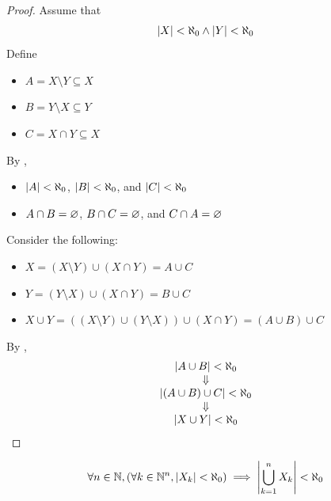 \begin{proof}
    Assume that
    \[
    \abs*{X} < \aleph_{0} \land \abs*{Y} < \aleph_{0}
    \]
    Define
    \begin{itemize}
        \item $A = X \setminus Y \subseteq X$
        \item $B = Y \setminus X \subseteq Y$
        \item $C = X \cap Y \subseteq X$
    \end{itemize}
    By ,
    \begin{itemize}
        \item $\abs*{A} < \aleph_{0}$, $\abs*{B} < \aleph_{0}$, and $\abs*{C} < \aleph_{0}$
        \item $A \cap B = \vnot$, $B \cap C = \vnot$, and $C \cap A = \vnot$
    \end{itemize}
    Consider the following:
    \begin{itemize}
        \item $X = (X \setminus Y) \cup (X \cap Y) = A \cup C$
        \item $Y = (Y \setminus X) \cup (X \cap Y) = B \cup C$
        \item $X \cup Y = ((X \setminus Y) \cup (Y \setminus X)) \cup (X \cap Y) = (A \cup B) \cup C$
    \end{itemize}
    By ,
    \[
    \begin{array}{c}
        \abs*{A \cup B} < \aleph_{0} \\
        \Downarrow \\
        \abs*{(A \cup B) \cup C} < \aleph_{0} \\
        \Downarrow \\
        \abs*{X \cup Y} < \aleph_{0}
    \end{array}
    \]
\end{proof}

\bigskip

\begin{theorem} \label{an:thm:finite-union-of-finite-sets-is-finite}
    \[
    \forall n \in \N, \paren*{\forall k \in \N^{n}, \abs*{X_{k}} < \aleph_{0}}
    \implies \abs*{\bigcup_{k = 1}^{n} X_{k}} < \aleph_{0}
    \]
\end{theorem}

